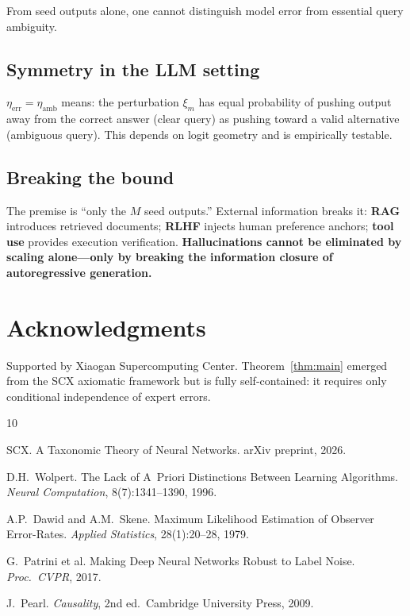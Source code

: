 \documentclass[10pt,a4paper]{article}
\theoremstyle{definition}
\theoremstyle{remark}
\begin{document}
From seed outputs alone, one cannot distinguish model error from essential query ambiguity.

\subsection*{Symmetry in the LLM setting}

$\eta_{\text{err}}=\eta_{\text{amb}}$ means: the perturbation $\xi_m$ has equal probability
of pushing output away from the correct answer (clear query) as pushing toward a valid
alternative (ambiguous query).  This depends on logit geometry and is empirically testable.

\subsection*{Breaking the bound}

The premise is ``only the $M$ seed outputs.''  External information breaks it:
\textbf{RAG} introduces retrieved documents; \textbf{RLHF} injects human preference anchors;
\textbf{tool use} provides execution verification.
\textbf{Hallucinations cannot be eliminated by scaling alone---only by breaking
the information closure of autoregressive generation.}

\section*{Acknowledgments}

Supported by Xiaogan Supercomputing Center.  Theorem~\ref{thm:main} emerged from the SCX
axiomatic framework \cite{scx2026} but is fully self-contained: it requires only conditional
independence of expert errors.

\begin{thebibliography}{10}

SCX.
\newblock A Taxonomic Theory of Neural Networks.
\newblock arXiv preprint, 2026.

D.H.\ Wolpert.
\newblock The Lack of A~Priori Distinctions Between Learning Algorithms.
\newblock \textit{Neural Computation}, 8(7):1341--1390, 1996.

A.P.\ Dawid and A.M.\ Skene.
\newblock Maximum Likelihood Estimation of Observer Error-Rates.
\newblock \textit{Applied Statistics}, 28(1):20--28, 1979.

G.\ Patrini et al.
\newblock Making Deep Neural Networks Robust to Label Noise.
\newblock \textit{Proc.\ CVPR}, 2017.

J.\ Pearl.
\newblock \textit{Causality}, 2nd ed.\ Cambridge University Press, 2009.

\end{thebibliography}
\end{document}
